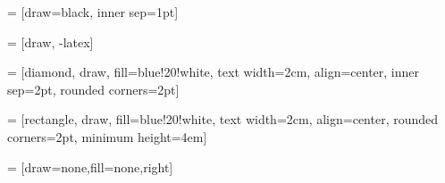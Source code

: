 \usepackage{tikz}
\usetikzlibrary{shapes,decorations,arrows}
\usetikzlibrary{positioning}
\usetikzlibrary{calc} %

\usepackage{xcolor} %

 = [draw=black, inner sep=1pt]
\newlength{\fnodewidth} %
\setlength{\fnodewidth}{6cm}

 = [draw, -latex]

 = [diamond, draw, fill=blue!20!white, text width=2cm,
    align=center, inner sep=2pt, rounded corners=2pt]

 = [rectangle, draw, fill=blue!20!white, text width=2cm,
    align=center, rounded corners=2pt, minimum height=4em]
    
 = [draw=none,fill=none,right]

%
%
%
\newcommand{\funcnode}[4]{
    \node [funcnode, #1] (#2) {
        \begin{minipage}{\fnodewidth}
            \begin{tabular}{l}
                \rowcolor[gray]{0.8}
                \begin{minipage}[c]{\textwidth - 2\tabcolsep}
                    \singlespacing
                    \begin{center}
                        \vspace{-\baselineskip}
                        \textbf{#3}
                    \end{center}
                \end{minipage}\\
                \begin{minipage}[c]{\textwidth - 2\tabcolsep}
                    \singlespacing
                    \begin{minipage}[c]{\textwidth - 2\tabcolsep}
                    #4
                    \end{minipage}
                    \vspace{0.5\baselineskip}\\
                \end{minipage}\\
            \end{tabular}
        \end{minipage}
    } %
} %

